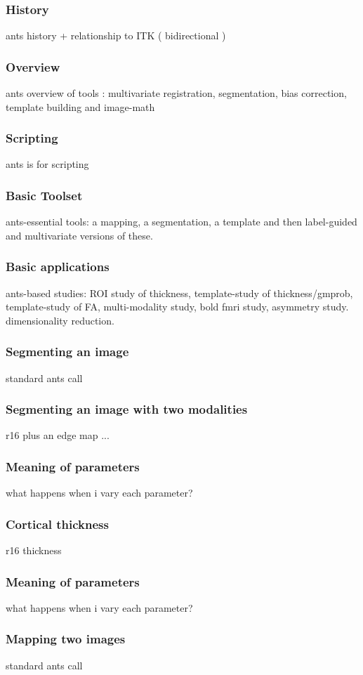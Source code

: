 \documentclass[18pt]{beamer}
\begin{document}
\begin{frame}
\frametitle{History}
ants history + relationship to ITK ( bidirectional )
\end{frame}

\begin{frame}
\frametitle{Overview}
ants overview of tools :  multivariate registration, segmentation, bias correction, template building and image-math 
\end{frame}

\begin{frame}
\frametitle{Scripting}
ants is for scripting 
\end{frame}

\begin{frame}
\frametitle{Basic Toolset}
ants-essential tools:  a mapping, a segmentation, a template and then label-guided and multivariate versions of these.  
\end{frame}

\begin{frame}
\frametitle{Basic applications}
ants-based studies:  ROI study of thickness, template-study of thickness/gmprob,  template-study of FA, multi-modality study, bold fmri study, asymmetry study.   dimensionality reduction.  
\end{frame}


\begin{frame}
\frametitle{Segmenting an image}
standard ants call 
\end{frame}

\begin{frame}
\frametitle{Segmenting an image with two modalities}
r16 plus an edge map ... 
\end{frame}

\begin{frame}
\frametitle{Meaning of parameters}
what happens when i vary each parameter?
\end{frame}

\begin{frame}
\frametitle{Cortical thickness}
r16 thickness 
\end{frame}

\begin{frame}
\frametitle{Meaning of parameters}
what happens when i vary each parameter?
\end{frame}

\begin{frame}
\frametitle{Mapping two images}
standard ants call 
\end{frame}
\end{document}
